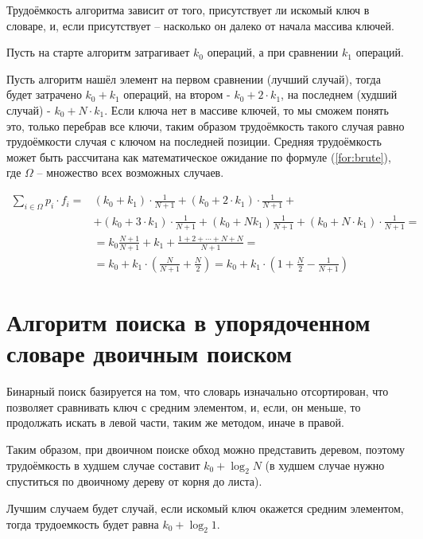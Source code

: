 Трудоёмкость алгоритма зависит от того, присутствует ли искомый ключ в словаре, и, если присутствует -- насколько он далеко от начала массива ключей.

Пусть на старте алгоритм затрагивает $k_{0}$ операций, а при сравнении $k_{1}$ операций. 

Пусть алгоритм нашёл элемент на первом сравнении (лучший случай), тогда будет затрачено $k_0 + k_1$ операций, на втором - $k_0 + 2 \cdot k_1$, на последнем (худший случай) - $k_0 + N \cdot k_1$. Если ключа нет в массиве ключей, то мы сможем понять это, только перебрав все ключи, таким образом трудоёмкость такого случая равно трудоёмкости случая с ключом на последней позиции. Средняя трудоёмкость может быть рассчитана как математическое ожидание по формуле (\ref{for:brute}), где $\Omega$ -- множество всех возможных случаев.

\begin{equation}
\label{for:brute}
\begin{aligned}
\sum\limits_{i \in \Omega} p_i \cdot f_i = & (k_0 + k_1) \cdot \frac{1}{N + 1} + (k_0 + 2 \cdot k_1) \cdot \frac{1}{N+1} +\\& + (k_0 + 3 \cdot k_1) \cdot \frac{1}{N + 1} + (k_0 + Nk_1)\frac{1}{N + 1} + (k_0 + N \cdot k_1) \cdot \frac{1}{N + 1} =\\& = k_0\frac{N+1}{N+1}+k_1+\frac{1 + 2 + \cdots + N + N}{N + 1} = \\& = k_0 + k_1 \cdot \left(\frac{N}{N + 1} + \frac{N}{2}\right) = k_0 + k_1 \cdot \left(1 + \frac{N}{2} - \frac{1}{N + 1}\right)
\end{aligned}
\end{equation}

\section{Алгоритм поиска в упорядоченном словаре двоичным поиском}
Бинарный поиск базируется на том, что словарь изначально отсортирован, что позволяет сравнивать ключ с средним элементом, и, если, он меньше, то продолжать искать в левой части, таким же методом, иначе в правой.

Таким образом, при двоичном поиске \cite{binary} обход можно представить деревом, поэтому трудоёмкость в худшем случае составит $k_{0} + \log_2 N$ (в худшем случае нужно спуститься по двоичному дереву от корня до листа).

Лучшим случаем будет случай, если искомый ключ окажется средним элементом, тогда трудоемкость будет равна $k_{0} + \log_2 1$.

